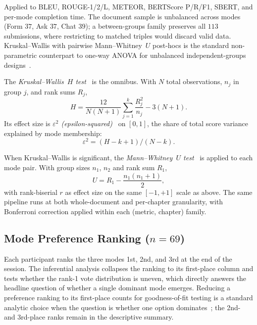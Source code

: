 Applied to BLEU, ROUGE-1/2/L, METEOR, BERTScore P/R/F1, SBERT, and per-mode completion time. The document sample is unbalanced across modes (Form $37$, Ask $37$, Chat $39$); a between-groups family preserves all $113$ submissions, where restricting to matched triples would discard valid data. Kruskal--Wallis with pairwise Mann--Whitney~$U$ post-hocs is the standard non-parametric counterpart to one-way ANOVA for unbalanced independent-groups designs~\cite{Field2018}.

The \emph{Kruskal--Wallis~$H$ test}~\cite{KruskalWallis1952} is the omnibus. With $N$ total observations, $n_j$ in group $j$, and rank sums $R_j$,
\begin{equation}
H = \frac{12}{N (N+1)} \sum_{j=1}^{k} \frac{R_j^2}{n_j} - 3 (N + 1).
\end{equation}
Its effect size is \emph{$\varepsilon^2$ (epsilon-squared)}~\cite{Kelley1935} on $[0, 1]$, the share of total score variance explained by mode membership:
\begin{equation}
\varepsilon^2 = (H - k + 1) / (N - k).
\end{equation}

When Kruskal--Wallis is significant, the \emph{Mann--Whitney~$U$ test}~\cite{MannWhitney1947} is applied to each mode pair. With group sizes $n_1$, $n_2$ and rank sum $R_1$,
\begin{equation}
U = R_1 - \frac{n_1 (n_1 + 1)}{2},
\end{equation}
with rank-biserial $r$ as effect size on the same $[-1, +1]$ scale as above. The same pipeline runs at both whole-document and per-chapter granularity, with Bonferroni correction applied within each (metric, chapter) family.

\subsection{Mode Preference Ranking ($n = 69$)}

Each participant ranks the three modes 1st, 2nd, and 3rd at the end of the session. The inferential analysis collapses the ranking to its first-place column and tests whether the rank-1 vote distribution is uneven, which directly answers the headline question of whether a single dominant mode emerges. Reducing a preference ranking to its first-place counts for goodness-of-fit testing is a standard analytic choice when the question is whether one option dominates~\cite{SauroLewis2016}; the 2nd- and 3rd-place ranks remain in the descriptive summary.

